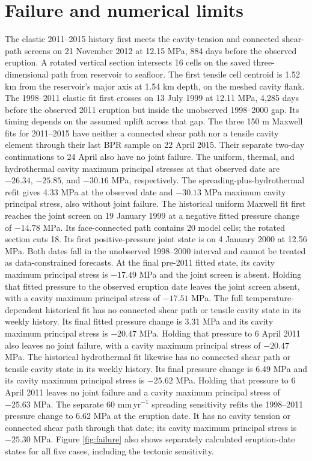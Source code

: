 \documentclass[10pt]{article}
\begin{document}
\section{Failure and numerical limits}
The elastic 2011--2015 history first meets the cavity-tension and connected
shear-path screens on 21 November 2012 at 12.15 MPa, 884 days before the
observed eruption. A rotated vertical section intersects 16 cells on the
saved three-dimensional path from reservoir to seafloor. The first tensile
cell centroid is 1.52 km from the reservoir's major axis at 1.54 km depth,
on the meshed cavity flank. The 1998--2011
elastic fit first crosses on 13 July 1999 at 12.11 MPa, 4,285 days before
the observed 2011 eruption but inside the unobserved 1998--2000 gap. Its
timing depends on the assumed uplift across that gap. The three 150 m
Maxwell fits for 2011--2015 have neither a connected shear path nor a tensile
cavity element through their last BPR sample on 22 April 2015.
Their separate two-day continuations to 24 April also have no joint failure.
The uniform, thermal, and hydrothermal cavity maximum principal stresses at
that observed date are $-26.34$, $-25.85$, and $-30.16$ MPa, respectively.
The spreading-plus-hydrothermal refit gives 4.33 MPa at the observed date
and $-30.13$ MPa maximum cavity principal stress, also without joint failure.
The historical uniform Maxwell fit first reaches the joint screen on
19 January 1999 at a negative fitted pressure change of $-14.78$ MPa.
Its face-connected path contains 20 model cells; the rotated section cuts 18.
Its first positive-pressure joint state is on 4 January 2000 at 12.56 MPa.
Both dates fall in the unobserved 1998--2000 interval and cannot be treated
as data-constrained forecasts. At the final pre-2011 fitted state, its cavity
maximum principal stress is $-17.49$ MPa and the joint screen is absent.
Holding that fitted pressure to the observed eruption date leaves the joint
screen absent, with a cavity maximum principal stress of $-17.51$ MPa.
The full temperature-dependent historical fit has no connected shear path
or tensile cavity state in its weekly history. Its final fitted pressure
change is 3.31 MPa and its cavity maximum principal stress is $-20.47$ MPa.
Holding that pressure to 6 April 2011 also leaves no joint failure, with a
cavity maximum principal stress of $-20.47$ MPa.
The historical hydrothermal fit likewise has no connected shear path or
tensile cavity state in its weekly history. Its final pressure change is
6.49 MPa and its cavity maximum principal stress is $-25.62$ MPa. Holding
that pressure to 6 April 2011 leaves no joint failure and a cavity maximum
principal stress of $-25.63$ MPa.
The separate 60 mm\,yr$^{-1}$ spreading sensitivity refits the 1998--2011
pressure change to 6.62 MPa at the eruption date. It has no cavity tension
or connected shear path through that date; its cavity maximum principal
stress is $-25.30$ MPa.
Figure \ref{fig:failure} also shows separately calculated eruption-date
states for all five cases, including the tectonic sensitivity.
\end{document}
